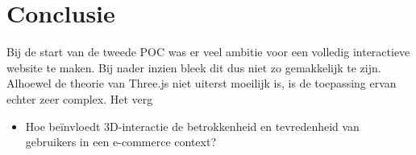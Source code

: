 
\chapter{Conclusie}%
\label{ch:conclusie}



Bij de start van de tweede POC was er veel ambitie voor een volledig interactieve website te maken. Bij nader inzien bleek dit dus niet zo gemakkelijk te zijn. Alhoewel de theorie van Three.js niet uiterst moeilijk is, is de toepassing ervan echter zeer complex. Het verg

\begin{itemize}
	\item Hoe beïnvloedt 3D-interactie de betrokkenheid en tevredenheid van gebruikers in een e-commerce context?
\end{itemize}